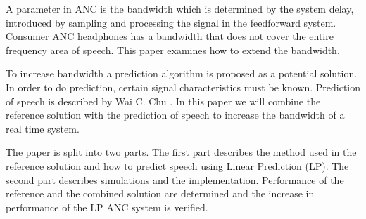 A parameter in ANC is the bandwidth which is determined by the system delay, introduced by sampling and processing the signal in the feedforward system. Consumer ANC headphones has a bandwidth that does not cover the entire frequency area of speech. This paper examines how to extend the bandwidth.

To increase bandwidth a prediction algorithm is proposed as a potential solution. In order to do prediction, certain signal characteristics must be known. Prediction of speech is described by Wai C. Chu \cite{Speech}. In this paper we will combine the reference solution with the prediction of speech to increase the bandwidth of a real time system.  

The paper is split into two parts. The first part describes the method used in the reference solution and how to predict speech using Linear Prediction (LP). The second part describes simulations and the implementation. Performance of the reference and the combined solution are determined and the increase in performance of the LP ANC system is verified.  
        







